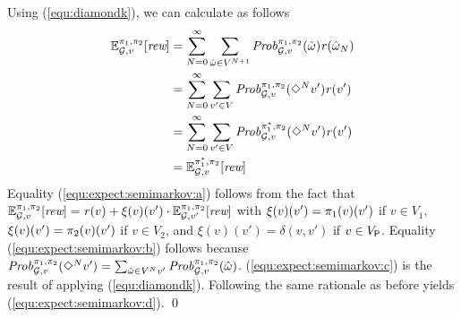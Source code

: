 \begin{myproof}
  Using (\ref{equ:diamondk}), we can calculate as follows
  \begin{align}
  \mathbb{E}^{\pi_{1}, \pi_{2}}_{\mathcal{G},v}[\textit{rew}]   &  = \sum^\infty_{N=0} \sum_{\hat{\omega} \in V^{N+1}} \mathit{Prob}^{\pi_{1}, \pi_{2}}_{\mathcal{G},v}(\hat{\omega})\mathit{r}(\hat{\omega}_N) \label{equ:expect:semimarkov:a}\\
  & = \sum^\infty_{N=0} \sum_{v' \in V} \mathit{Prob}^{\pi_{1}, \pi_{2}}_{\mathcal{G},v}(\Diamond^N v')\mathit{r}(v') \label{equ:expect:semimarkov:b}\\
  & =  \sum^\infty_{N=0} \sum_{v' \in V} \mathit{Prob}^{\pi^*_{1}, \pi_{2}}_{\mathcal{G},v}(\Diamond^N v')\mathit{r}(v') \label{equ:expect:semimarkov:c}\\
  &  = \mathbb{E}^{\pi^*_{1}, \pi_{2}}_{\mathcal{G},v}[\textit{rew}] \label{equ:expect:semimarkov:d}
  \end{align}
  Equality (\ref{equ:expect:semimarkov:a}) follows from the fact that
  $\mathbb{E}^{\pi_{1}, \pi_{2}}_{\mathcal{G},v}[\textit{rew}]= \mathit{r}(v) + \xi(v)(v') \cdot \mathbb{E}^{\pi_{1}, \pi_{2}}_{\mathcal{G},v'}[\textit{rew}]$
  with $\xi(v)(v')=\pi_{1}(v)(v')$ if $v\in V_1$,
  $\xi(v)(v')=\pi_{2}(v)(v')$ if $v\in V_2$, and $\xi(v)(v')=\delta(v,v')$
  if $v\in V_{\mathsf{P}}$.
  Equality (\ref{equ:expect:semimarkov:b}) follows because
  $\mathit{Prob}^{\pi_{1}, \pi_{2}}_{\mathcal{G},v}(\Diamond^N v')=\sum_{\hat{\omega} \in V^{N}v'} \mathit{Prob}^{\pi_{1}, \pi_{2}}_{\mathcal{G},v}(\hat{\omega})$.
  (\ref{equ:expect:semimarkov:c}) is the result of applying
  (\ref{equ:diamondk}).
  Following the same rationale as before yields (\ref{equ:expect:semimarkov:d}).
\qed
\end{myproof}




